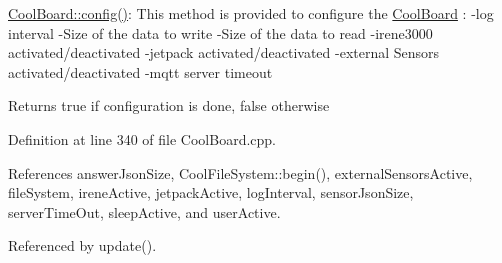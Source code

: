 \hyperlink{classCoolBoard_a583a874c09c07e70a6eb9229fc4beddb}{Cool\+Board\+::config()}\+: This method is provided to configure the \hyperlink{classCoolBoard}{Cool\+Board} \+: -\/log interval -\/\+Size of the data to write -\/\+Size of the data to read -\/irene3000 activated/deactivated -\/jetpack activated/deactivated -\/external Sensors activated/deactivated -\/mqtt server timeout

\begin{DoxyReturn}{Returns}
true if configuration is done, false otherwise 
\end{DoxyReturn}


Definition at line 340 of file Cool\+Board.\+cpp.



References answer\+Json\+Size, Cool\+File\+System\+::begin(), external\+Sensors\+Active, file\+System, irene\+Active, jetpack\+Active, log\+Interval, sensor\+Json\+Size, server\+Time\+Out, sleep\+Active, and user\+Active.



Referenced by update().


